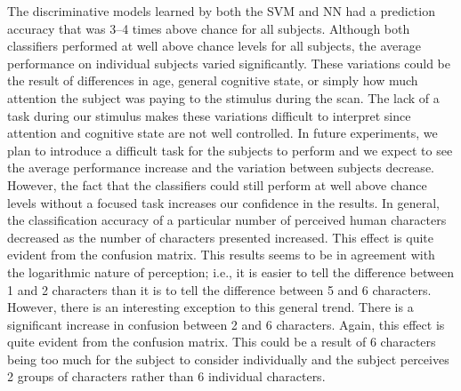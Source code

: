 \documentclass[preprint,5p,authoryear]{elsarticle}
\begin{document}
The discriminative models learned by both the SVM and NN had a prediction accuracy that was 3--4 times above chance for all subjects.
Although both classifiers performed at well above chance levels for all subjects, the average performance on individual subjects varied significantly.
These variations could be the result of differences in age, general cognitive state, or simply how much attention the subject was paying to the stimulus during the scan.
The lack of a task during our stimulus makes these variations difficult to interpret since attention and cognitive state are not well controlled.
In future experiments, we plan to introduce a difficult task for the subjects to perform and we expect to see the average performance increase and the variation between subjects decrease.
However, the fact that the classifiers could still perform at well above chance levels without a focused task increases our confidence in the results.
In general, the classification accuracy of a particular number of perceived human characters decreased as the number of characters presented increased.
This effect is quite evident from the confusion matrix.
This results seems to be in agreement with the logarithmic nature of perception; i.e., it is easier to tell the difference between 1 and 2 characters than it is to tell the difference between 5 and 6 characters.
However, there is an interesting exception to this general trend.
There is a significant increase in confusion between 2 and 6 characters.
Again, this effect is quite evident from the confusion matrix.
This could be a result of 6 characters being too much for the subject to consider individually and the subject perceives 2 groups of characters rather than 6 individual characters.
\end{document}
